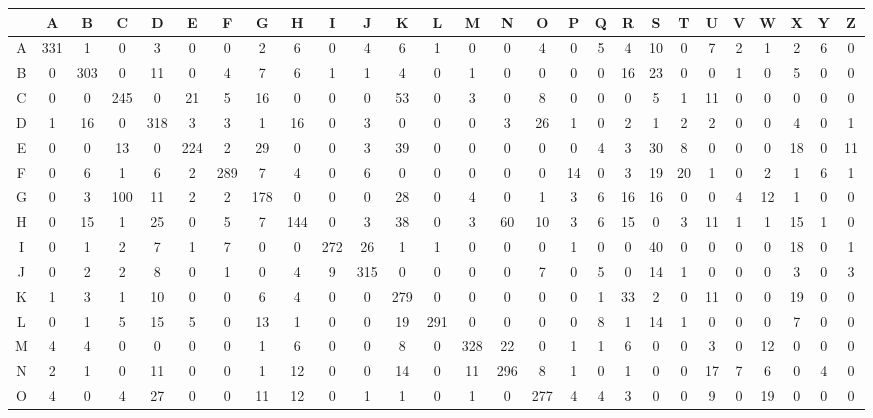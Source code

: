 \begin{tabular}{|c|c|c|c|c|c|c|c|c|c|c|c|c|c|c|c|c|c|c|c|c|c|c|c|c|c|c|}
  \hline
  & A & B & C & D & E & F & G & H & I & J & K & L & M & N & O & P & Q & R & S & T & U & V & W & X & Y & Z \\ \hline  
  A & 331 & 1 & 0 & 3 & 0 & 0 & 2 & 6 & 0 & 4 & 6 & 1 & 0 & 0 & 4 & 0 & 5 & 4 & 10 & 0 & 7 & 2 & 1 & 2 & 6 & 0 \\ \hline
  B & 0 & 303 & 0 & 11 & 0 & 4 & 7 & 6 & 1 & 1 & 4 & 0 & 1 & 0 & 0 & 0 & 0 & 16 & 23 & 0 & 0 & 1 & 0 & 5 & 0 & 0 \\ \hline
  C & 0 & 0 & 245 & 0 & 21 & 5 & 16 & 0 & 0 & 0 & 53 & 0 & 3 & 0 & 8 & 0 & 0 & 0 & 5 & 1 & 11 & 0 & 0 & 0 & 0 & 0 \\ \hline
  D & 1 & 16 & 0 & 318 & 3 & 3 & 1 & 16 & 0 & 3 & 0 & 0 & 0 & 3 & 26 & 1 & 0 & 2 & 1 & 2 & 2 & 0 & 0 & 4 & 0 & 1 \\ \hline
  E & 0 & 0 & 13 & 0 & 224 & 2 & 29 & 0 & 0 & 3 & 39 & 0 & 0 & 0 & 0 & 0 & 4 & 3 & 30 & 8 & 0 & 0 & 0 & 18 & 0 & 11 \\ \hline
  F & 0 & 6 & 1 & 6 & 2 & 289 & 7 & 4 & 0 & 6 & 0 & 0 & 0 & 0 & 0 & 14 & 0 & 3 & 19 & 20 & 1 & 0 & 2 & 1 & 6 & 1 \\ \hline
  G & 0 & 3 & 100 & 11 & 2 & 2 & 178 & 0 & 0 & 0 & 28 & 0 & 4 & 0 & 1 & 3 & 6 & 16 & 16 & 0 & 0 & 4 & 12 & 1 & 0 & 0 \\ \hline
  H & 0 & 15 & 1 & 25 & 0 & 5 & 7 & 144 & 0 & 3 & 38 & 0 & 3 & 60 & 10 & 3 & 6 & 15 & 0 & 3 & 11 & 1 & 1 & 15 & 1 & 0 \\ \hline
  I & 0 & 1 & 2 & 7 & 1 & 7 & 0 & 0 & 272 & 26 & 1 & 1 & 0 & 0 & 0 & 1 & 0 & 0 & 40 & 0 & 0 & 0 & 0 & 18 & 0 & 1 \\ \hline
  J & 0 & 2 & 2 & 8 & 0 & 1 & 0 & 4 & 9 & 315 & 0 & 0 & 0 & 0 & 7 & 0 & 5 & 0 & 14 & 1 & 0 & 0 & 0 & 3 & 0 & 3 \\ \hline
  K & 1 & 3 & 1 & 10 & 0 & 0 & 6 & 4 & 0 & 0 & 279 & 0 & 0 & 0 & 0 & 0 & 1 & 33 & 2 & 0 & 11 & 0 & 0 & 19 & 0 & 0 \\ \hline
  L & 0 & 1 & 5 & 15 & 5 & 0 & 13 & 1 & 0 & 0 & 19 & 291 & 0 & 0 & 0 & 0 & 8 & 1 & 14 & 1 & 0 & 0 & 0 & 7 & 0 & 0 \\ \hline
  M & 4 & 4 & 0 & 0 & 0 & 0 & 1 & 6 & 0 & 0 & 8 & 0 & 328 & 22 & 0 & 1 & 1 & 6 & 0 & 0 & 3 & 0 & 12 & 0 & 0 & 0 \\ \hline
  N & 2 & 1 & 0 & 11 & 0 & 0 & 1 & 12 & 0 & 0 & 14 & 0 & 11 & 296 & 8 & 1 & 0 & 1 & 0 & 0 & 17 & 7 & 6 & 0 & 4 & 0 \\ \hline
  O & 4 & 0 & 4 & 27 & 0 & 0 & 11 & 12 & 0 & 1 & 1 & 0 & 1 & 0 & 277 & 4 & 4 & 3 & 0 & 0 & 9 & 0 & 19 & 0 & 0 & 0 \\ \hline

\end{tabular}
